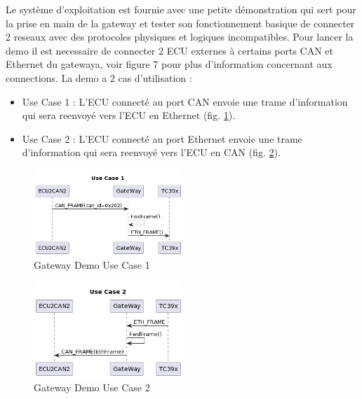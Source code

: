 Le syst\`eme d'exploitation est fournie avec une petite démonstration qui sert pour la prise en main de la gateway et tester son fonctionnement basique de connecter 2 reseaux avec des protocoles physiques et logiques incompatibles. Pour lancer la demo il est necessaire de connecter 2 ECU externes \`a certains ports CAN et Ethernet du gatewaya, voir figure 7 pour plus d'information concernant aux connections. La demo a 2 cas d'utilisation :


\begin{itemize}
    \item Use Case 1 : L'ECU connect\'e au port CAN envoie une trame d'information qui sera reenvoy\'e vers l'ECU en Ethernet (fig. \ref{fig:gw-demo-uc1}).%
    \item Use Case 2 : L'ECU connect\'e au port Ethernet envoie une trame d'information qui sera reenvoy\'e vers l'ECU en CAN (fig. \ref{fig:gw-demo-uc2}).%
\end{itemize}

\begin{figure}[!htb]
 \centering
 \includegraphics[width=0.5\textwidth]{img/GWUseCase1.png}
 \caption{Gateway Demo Use Case 1}
 \label{fig:gw-demo-uc1}
\end{figure}

\begin{figure}[!htb]
 \centering
 \includegraphics[width=0.5\textwidth]{img/GWUseCase2.png}
 \caption{Gateway Demo Use Case 2}
 \label{fig:gw-demo-uc2}
\end{figure}

